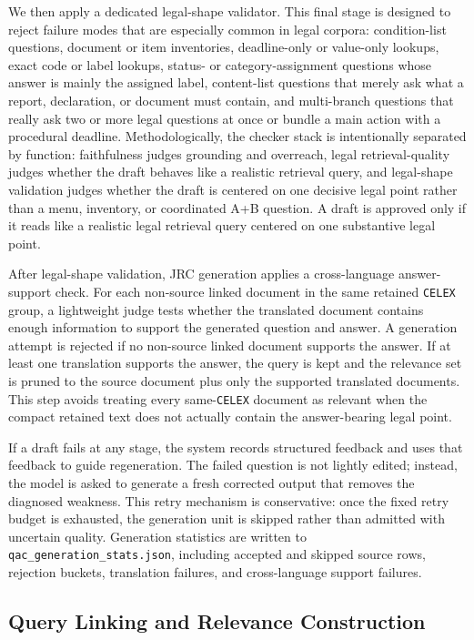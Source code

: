 We then apply a dedicated legal-shape validator. This final stage is designed to reject failure modes that are especially common in legal corpora: condition-list questions, document or item inventories, deadline-only or value-only lookups, exact code or label lookups, status- or category-assignment questions whose answer is mainly the assigned label, content-list questions that merely ask what a report, declaration, or document must contain, and multi-branch questions that really ask two or more legal questions at once or bundle a main action with a procedural deadline. Methodologically, the checker stack is intentionally separated by function: faithfulness judges grounding and overreach, legal retrieval-quality judges whether the draft behaves like a realistic retrieval query, and legal-shape validation judges whether the draft is centered on one decisive legal point rather than a menu, inventory, or coordinated A+B question. A draft is approved only if it reads like a realistic legal retrieval query centered on one substantive legal point.

After legal-shape validation, JRC generation applies a cross-language answer-support check. For each non-source linked document in the same retained \texttt{CELEX} group, a lightweight judge tests whether the translated document contains enough information to support the generated question and answer. A generation attempt is rejected if no non-source linked document supports the answer. If at least one translation supports the answer, the query is kept and the relevance set is pruned to the source document plus only the supported translated documents. This step avoids treating every same-\texttt{CELEX} document as relevant when the compact retained text does not actually contain the answer-bearing legal point.

If a draft fails at any stage, the system records structured feedback and uses that feedback to guide regeneration. The failed question is not lightly edited; instead, the model is asked to generate a fresh corrected output that removes the diagnosed weakness. This retry mechanism is conservative: once the fixed retry budget is exhausted, the generation unit is skipped rather than admitted with uncertain quality. Generation statistics are written to \texttt{qac\_generation\_stats.json}, including accepted and skipped source rows, rejection buckets, translation failures, and cross-language support failures.

\subsection{Query Linking and Relevance Construction}

